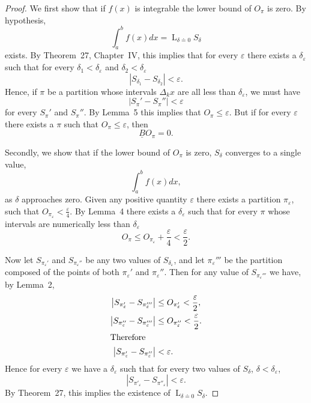 \documentclass[a4paper,12pt]{book}[2004/02/16]
\providecommand{\leqq}{\leq}
\providecommand{\hyperlink}[2]{#2}
\theoremstyle{ilemma}
\theoremstyle{itheorem}
\theoremstyle{iother}
\theoremstyle{icorollary}
\theoremstyle{numcorollary}
\theoremstyle{idefinition}
\renewcommand{\dfrac}[2]{\frac{#1}{#2}}%
\begin{document}
\begin{proof}
We first show that if $f(x)$ is integrable the lower bound of
$O_{\pi}$ is zero. By hypothesis,
\[
  \int_a^bf(x)dx=\mathop{L}_{\delta\doteq 0}S_{\delta}
\]
exists. By Theorem~\hyperlink{thm27}{27}, Chapter~\hyperlink{chapIV}{IV}, this implies that for every $\varepsilon$
there exists a $\delta_{\varepsilon}$ such that for every
$\delta_1<\delta_\varepsilon$ and $\delta_2<\delta_\varepsilon$
\[
  \left|S_{\delta_1}-S_{\delta_2}\right|<\varepsilon.
\]
Hence, if $\pi$ be a partition whose intervals $\Delta_k x$ are all
less than $\delta_\varepsilon$, we must have
\[
  \left|S_\pi'-S_\pi''\right|<\varepsilon
\]
for every $S_\pi'$ and $S_\pi''$. By Lemma~\hyperlink{lem5p179}{5} this implies that
$O_\pi\leqq \varepsilon$.  But if for every $\varepsilon$ there exists
a $\pi$ such that $O_\pi\leqq \varepsilon$, then
\[
  \underline{B}O_\pi=0.
\]

Secondly, we show that if the lower bound of $O_\pi$ is zero,
$S_\delta$ converges to a single value,
\[
\int_a^bf(x)dx,
\]
as $\delta$ approaches zero. Given any positive quantity $\varepsilon$
there exists a partition $\pi_\varepsilon$, such that
$O_{\pi_\varepsilon}<\dfrac\varepsilon4$. By Lemma~\hyperlink{lem4p178}{4} there exists a
$\delta_\varepsilon$ such that for every $\pi$ whose intervals are
numerically less than $\delta_\varepsilon$
\[
  O_\pi\leqq O_{\pi_\varepsilon}+\frac\varepsilon4<\frac\varepsilon2.
\]

Now let $S_{\pi_\varepsilon'}$ and $S_{\pi_\varepsilon''}$ be any
two values of $S_{\delta_\varepsilon}$, and let $\pi_\varepsilon'''$
be the partition composed of the points of both $\pi_\varepsilon'$
and $\pi_\varepsilon''$. Then for any value of
${S_{\pi_\varepsilon'''}}$ we have, by Lemma~\hyperlink{lem2p156}{2},
\begin{align*}
  \left|S_{\pi_\varepsilon'}-S_{\pi_\varepsilon'''}\right| &\leqq
  O_{\pi_\varepsilon'}< \frac\varepsilon2,\\
  \left|S_{\pi_\varepsilon''}-S_{\pi_\varepsilon'''}\right| &\leqq
  O_{\pi_\varepsilon''}< \frac\varepsilon2.\\
\intertext{Therefore}
  \left|S_{\pi_\varepsilon'}-S_{\pi_\varepsilon''}\right|
  &<\varepsilon.
\end{align*}
Hence for every $\varepsilon$ we have a $\delta_\varepsilon$ such that
for every two values of $S_\delta$, $\delta < \delta_\varepsilon$,
\[
  |S_{\pi'_\varepsilon}-S_{\pi''_\varepsilon}|
< \varepsilon.
\]
By Theorem~\hyperlink{thm27}{27}, this implies the existence of $\displaystyle\mathop{L}_{\delta\doteq
0} S_\delta$.
\end{proof}
\end{document}
